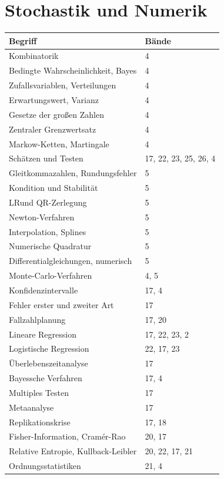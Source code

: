 \section*{Stochastik und Numerik}
\nopagebreak
{\small\renewcommand{\arraystretch}{1.32}
\begin{longtable}{@{}P{5.6cm}P{2.8cm}@{}}
\toprule
\textbf{Begriff} & \textbf{Bände}\\
\midrule
\endhead
Kombinatorik & 4\\
Bedingte Wahrscheinlichkeit, Bayes & 4\\
Zufallsvariablen, Verteilungen & 4\\
Erwartungswert, Varianz & 4\\
Gesetze der großen Zahlen & 4\\
Zentraler Grenzwertsatz & 4\\
Markow-Ketten, Martingale & 4\\
Schätzen und Testen & 17, 22, 23, 25, 26, 4\\
Gleitkommazahlen, Rundungsfehler & 5\\
Kondition und Stabilität & 5\\
LRund QR-Zerlegung & 5\\
Newton-Verfahren & 5\\
Interpolation, Splines & 5\\
Numerische Quadratur & 5\\
Differentialgleichungen, numerisch & 5\\
Monte-Carlo-Verfahren & 4, 5\\
Konfidenzintervalle & 17, 4\\
Fehler erster und zweiter Art & 17\\
Fallzahlplanung & 17, 20\\
Lineare Regression & 17, 22, 23, 2\\
Logistische Regression & 22, 17, 23\\
Überlebenszeitanalyse & 17\\
Bayessche Verfahren & 17, 4\\
Multiples Testen & 17\\
Metaanalyse & 17\\
Replikationskrise & 17, 18\\
Fisher-Information, Cramér-Rao & 20, 17\\
Relative Entropie, Kullback-Leibler & 20, 22, 17, 21\\
Ordnungsstatistiken & 21, 4\\
\bottomrule
\end{longtable}}

